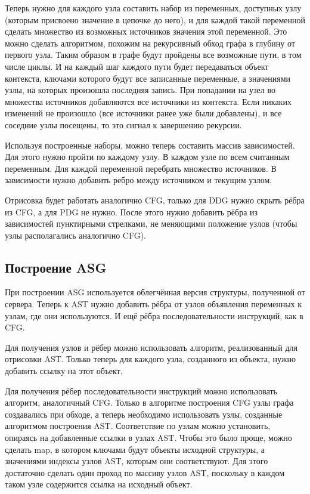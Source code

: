 Теперь нужно для каждого узла составить набор из переменных, доступных узлу (которым присвоено значение в цепочке до него), и для каждой такой переменной сделать множество из возможных источников значения этой переменной. Это можно сделать алгоритмом, похожим на рекурсивный обход графа в глубину от первого узла. Таким образом в графе будут пройдены все возможные пути, в том числе циклы. И на каждый шаг каждого пути будет передаваться объект контекста, ключами которого будут все записанные переменные, а значениями узлы, на которых произошла последняя запись. При попадании на узел во множества источников добавляются все источники из контекста. Если никаких изменений не произошло (все источники ранее уже были добавлены), и все соседние узлы посещены, то это сигнал к завершению рекурсии.

Используя построенные наборы, можно теперь составить массив зависимостей. Для этого нужно пройти по каждому узлу. В каждом узле по всем считанным переменным. Для каждой переменной перебрать множество источников. В зависимости нужно добавить ребро между источником и текущим узлом.

Отрисовка будет работать аналогично CFG, только для DDG нужно скрыть рёбра из CFG, а для PDG не нужно. После этого нужно добавить рёбра из зависимостей пунктирными стрелками, не меняющими положение узлов (чтобы узлы располагались аналогично CFG).
\subsection{Построение ASG} \label{ch2:subsec-title-abbr}

При построении ASG используется облегчённая версия структуры, полученной от сервера. Теперь к AST нужно добавить рёбра от узлов объявления переменных к узлам, где они используются. И ещё рёбра последовательности инструкций, как в CFG.

Для получения узлов и рёбер можно использовать алгоритм, реализованный для отрисовки AST. Только теперь для каждого узла, созданного из объекта, нужно добавить ссылку на этот объект.

Для получения рёбер последовательности инструкций можно использовать алгоритм, аналогичный CFG. Только в алгоритме построения CFG узлы графа создавались при обходе, а теперь необходимо использовать узлы, созданные алгоритмом построения AST. Соответствие по узлам можно установить, опираясь на добавленные ссылки в узлах AST. Чтобы это было проще, можно сделать map, в котором ключами будут объекты исходной структуры, а значениями индексы узлов AST, которым они соответствуют. Для этого достаточно сделать один проход по массиву узлов AST, поскольку в каждом таком узле содержится ссылка на исходный объект.

